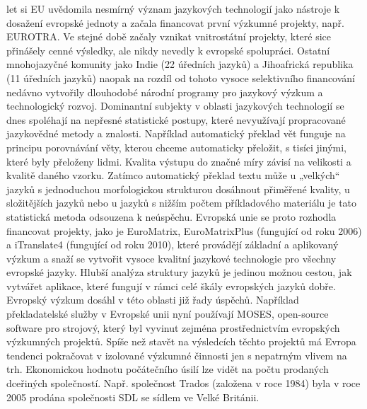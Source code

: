 \documentclass[]{../../metanetpaper}
\begin{document}
\begin{multicols}{2}

let si EU uvědomila nesmírný význam jazykových technologií jako nástroje k dosažení evropské jednoty a začala financovat první výzkumné projekty, např. EUROTRA. Ve stejné době začaly vznikat vnitrostátní projekty, které sice přinášely cenné výsledky, ale nikdy nevedly k evropské spolupráci. Ostatní mnohojazyčné komunity jako Indie (22 úředních jazyků) a Jihoafrická republika (11 úředních jazyků) naopak na rozdíl od tohoto vysoce selektivního financování nedávno vytvořily dlouhodobé národní programy pro jazykový výzkum a technologický rozvoj. Dominantní subjekty v oblasti jazykových technologií se dnes spoléhají na nepřesné statistické postupy, které nevyužívají propracované jazykovědné metody a znalosti. Například automatický překlad vět funguje na principu porovnávání věty, kterou chceme automaticky přeložit, s tisíci jinými, které byly přeloženy lidmi. Kvalita výstupu do značné míry závisí na velikosti a kvalitě daného vzorku. Zatímco automatický překlad textu může u „velkých“ jazyků s jednoduchou morfologickou strukturou dosáhnout přiměřené kvality, u složitějších jazyků nebo u jazyků s nižším počtem příkladového materiálu je tato statistická metoda odsouzena k neúspěchu.
Evropská unie se proto rozhodla financovat projekty, jako je EuroMatrix, EuroMatrixPlus (fungující od roku 2006) a iTranslate4 (fungující od roku 2010), které provádějí základní a aplikovaný výzkum a snaží se vytvořit vysoce kvalitní jazykové technologie pro všechny evropské jazyky. Hlubší analýza struktury jazyků je jedinou možnou cestou, jak vytvářet aplikace, které fungují v rámci celé škály evropských jazyků dobře.
Evropský výzkum dosáhl v této oblasti již řady úspěchů. Například překladatelské služby v Evropské unii nyní používají MOSES, open-source software pro strojový, který byl vyvinut zejména prostřednictvím evropských výzkumných projektů. Spíše než stavět na výsledcích těchto projektů má Evropa tendenci pokračovat v izolované výzkumné činnosti jen s nepatrným vlivem na trh. Ekonomickou hodnotu počátečního úsilí lze vidět na počtu prodaných dceřiných společností. Např. společnost Trados (založena v roce 1984) byla v roce 2005 prodána společnosti SDL se sídlem ve Velké Británii.



\end{multicols}
\end{document}
